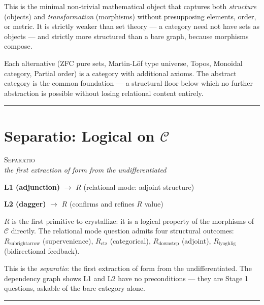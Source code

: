 \documentclass[12pt,a4paper]{article}
\begin{document}
This is the minimal non-trivial mathematical object that captures both \emph{structure} (objects) and \emph{transformation} (morphisms) without presupposing elements, order, or metric. It is strictly weaker than set theory --- a category need not have sets as objects --- and strictly more structured than a bare graph, because morphisms compose.

Each alternative (ZFC pure sets, Martin-L\"of type universe, Topos, Monoidal category, Partial order) is a category with additional axioms. The abstract category is the common foundation --- a structural floor below which no further abstraction is possible without losing relational content entirely.

\begin{center}
\rule{0.5\textwidth}{0.4pt}
\end{center}

\section{Separatio: Logical on $\mathcal{C}$}

\begin{center}
\vspace{0.5em}
{\large\textsc{Separatio}}
\\[4pt]
{\small\itshape the first extraction of form from the undifferentiated}
\vspace{0.4em}
\end{center}

\noindent\textbf{L1 (adjunction)} $\to$ $R$ (relational mode: adjoint structure)

\noindent\textbf{L2 (dagger)} $\to$ $R$ (confirms and refines $R$ value)

$R$ is the first primitive to crystallize: it is a logical property of the morphisms of $\mathcal{C}$ directly. The relational mode question admits four structural outcomes: $R_{\text{subrightarrow}}$ (supervenience), $R_{\text{ctz}}$ (categorical), $R_{\text{downstep}}$ (adjoint), $R_{\text{lyoghlig}}$ (bidirectional feedback). 

This is the \emph{separatio}: the first extraction of form from the undifferentiated. The dependency graph shows L1 and L2 have no preconditions --- they are Stage 1 questions, askable of the bare category alone.

\begin{center}
\rule{0.5\textwidth}{0.4pt}
\end{center}
\end{document}
